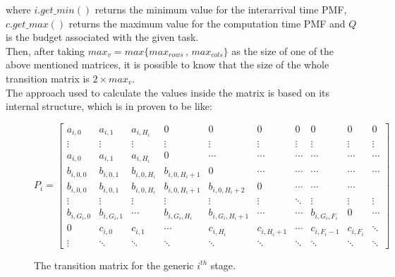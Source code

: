 where \( i.get\_min() \) returns the minimum value for the interarrival time PMF, \( c.get\_max() \) returns the maximum value for the computation time PMF and \( Q \) is the budget associated with the given task.\\
Then, after taking \( max_{v} = max\{max_{rows}\,,\,max_{cols}\} \) as the size of one of the above mentioned matrices, it is possible to know that the size of the whole transition matrix is \( 2 \times max_{v} \).\\
The approach used to calculate the values inside the matrix is based on its internal structure, which is in proven\cite{pipelines} to be like:
\begin{figure}[H] \label{matrixstructure}
\begin{equation*} 
  P_{i} = 
  \begin{bmatrix}
    a_{i,0} & a_{i,1} & a_{i,H_{i}} & 0 & 0 & 0 & 0 & 0 & 0 & 0 \\
    \vdots & \vdots & \vdots & \vdots & \vdots & \vdots & \vdots & \vdots & \vdots & \vdots\\
    a_{i,0} & a_{i,1} & a_{i,H_{i}} & 0 & \cdots & \cdots & \cdots & \cdots & \cdots & \cdots \\
    b_{i,0,0} & b_{i,0,1} & b_{i,0,H_{i}} & b_{i,0,H_{i}+1} & 0 & \cdots & \cdots & \cdots & \cdots & \cdots \\
    b_{i,0,0} & b_{i,0,1} & b_{i,0,H_{i}} & b_{i,0,H_{i}+1} & b_{i,0,H_{i}+2} & 0 & \cdots & \cdots & \cdots \\
    \vdots & \vdots & \vdots & \vdots & \vdots & \vdots & \ddots & \vdots & \vdots & \vdots \\
    b_{i,G_{i},0} & b_{i,G_{i},1} & \cdots & b_{i,G_{i},H_{i}} & b_{i,G_{i},H_{i}+1} & \cdots & \cdots & b_{i,G_{i},F_{i}} & 0 & \cdots \\
    0 & c_{i,0} & c_{i,1} & \cdots & c_{i,H_{i}} & c_{i,H_{i}+1} & \cdots & c_{i,F_{i}-1} & c_{i,F_{i}} & \ddots \\
    \vdots & \ddots & \ddots & \ddots & \ddots & \ddots & \ddots & \ddots & \ddots & \ddots
  \end{bmatrix}
\end{equation*}
\caption{The transition matrix for the generic \( i^{th} \) stage.}
\end{figure}

